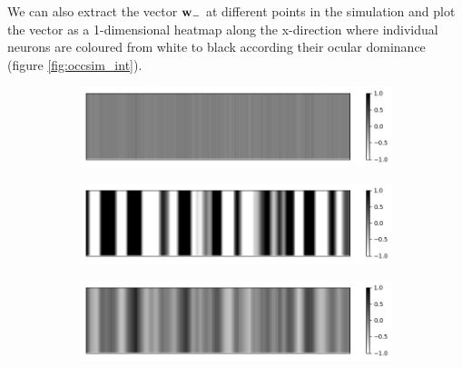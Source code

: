 \documentclass{article}
\begin{document}
We can also extract the vector ${\bf w}_-$ at different points in the simulation and plot the vector as a 1-dimensional heatmap along the x-direction where individual neurons are coloured from white to black according their ocular dominance (figure \ref{fig:occsim_int}).


\begin{figure}[h]
	\centering
	\begin{subfigure}[t]{0.49\linewidth}
		\centering
		\includegraphics[width = 1.0\linewidth, trim={0 0 0 0}, clip=true]{figures/occsim_int/i50.png}
	\end{subfigure}%
	\hspace{0.01\linewidth}
	\begin{subfigure}[t]{0.49\linewidth}
		\centering
		\includegraphics[width = 1.0\linewidth, trim={0 0 0 0}, clip=true]{figures/occsim_int/i300.png}
	\end{subfigure}%
	\hspace{0.01\linewidth}
	\begin{subfigure}[t]{0.49\linewidth}
		\centering
		\includegraphics[width = 1.0\linewidth, trim={0 0 0 0}, clip=true]{figures/occsim_int/i200.png}
	\end{subfigure}%
	\hspace{0.01\linewidth}
	\begin{subfigure}[t]{0.49\linewidth}

\end{subfigure}
\end{figure}
\end{document}
